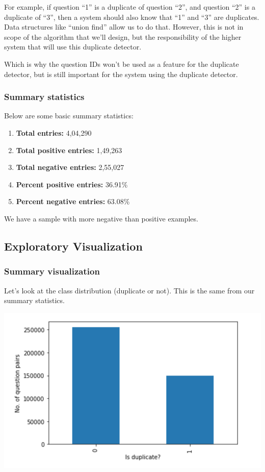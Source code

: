 \documentclass{article}
\begin{document}
For example, if question ``1'' is a duplicate of question ``2'', and question ``2'' is a duplicate of ``3'', then a system should also know that ``1'' and ``3'' are duplicates. Data structures like ``union find'' allow us to do that. However, this is not in scope of the algorithm that we'll design, but the responsibility of the higher system that will use this duplicate detector.

Which is why the question IDs won't be used as a feature for the duplicate detector, but is still important for the system using the duplicate detector.

\subsubsection{Summary statistics}

Below are some basic summary statistics:

\begin{enumerate}
\item{\textbf{Total entries:} 4,04,290}
\item{\textbf{Total positive entries:} 1,49,263}
\item{\textbf{Total negative entries:} 2,55,027}
\item{\textbf{Percent positive entries:} 36.91\%}
\item{\textbf{Percent negative entries:} 63.08\%}
\end{enumerate}

We have a sample with more negative than positive examples.

\subsection{Exploratory Visualization}

\subsubsection{Summary visualization}

Let's look at the class distribution (duplicate or not). This is the same from our summary statistics.

\noindent\includegraphics[width=\textwidth]{category_plot}
\end{document}
